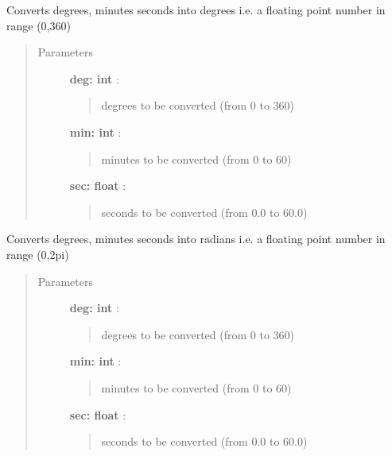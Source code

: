 \documentclass[letterpaper,10pt,english]{sphinxmanual}
\begin{document}
\begin{fulllineitems}
\label{index:astroCoords.decdms2deg}
Converts degrees, minutes seconds into degrees
i.e. a floating point number in range (0,360)
\begin{quote}\begin{description}
\item[{Parameters }] \leavevmode
\textbf{deg: int} :
\begin{quote}

degrees to be converted (from 0 to 360)
\end{quote}

\textbf{min: int} :
\begin{quote}

minutes to be converted (from 0 to 60)
\end{quote}

\textbf{sec: float} :
\begin{quote}

seconds to be converted (from 0.0 to 60.0)
\end{quote}

\end{description}\end{quote}

\end{fulllineitems}



\begin{fulllineitems}
\label{index:astroCoords.decdms2rad}
Converts degrees, minutes seconds into radians 
i.e. a floating point number in range (0,2pi)
\begin{quote}\begin{description}
\item[{Parameters }] \leavevmode
\textbf{deg: int} :
\begin{quote}

degrees to be converted (from 0 to 360)
\end{quote}

\textbf{min: int} :
\begin{quote}

minutes to be converted (from 0 to 60)
\end{quote}

\textbf{sec: float} :
\begin{quote}

seconds to be converted (from 0.0 to 60.0)
\end{quote}

\end{description}\end{quote}

\end{fulllineitems}
\end{document}
